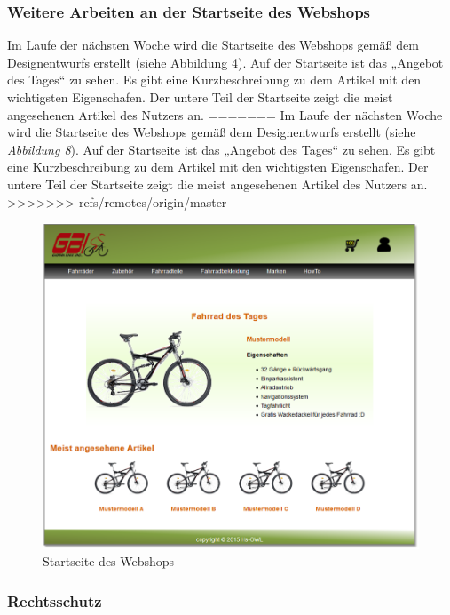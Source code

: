 \subsubsection{Weitere Arbeiten an der Startseite des Webshops}

Im Laufe der nächsten Woche wird die Startseite des Webshops gemäß dem Designentwurfs erstellt (siehe Abbildung 4). Auf der Startseite ist das „Angebot des Tages“ zu sehen. Es gibt eine Kurzbeschreibung zu dem Artikel mit den wichtigsten Eigenschafen. Der untere Teil der Startseite zeigt die meist angesehenen Artikel des Nutzers an. 
=======
Im Laufe der nächsten Woche wird die Startseite des Webshops gemäß dem Designentwurfs erstellt (siehe \textit{Abbildung 8}). Auf der Startseite ist das „Angebot des Tages“ zu sehen. Es gibt eine Kurzbeschreibung zu dem Artikel mit den wichtigsten Eigenschafen. Der untere Teil der Startseite zeigt die meist angesehenen Artikel des Nutzers an. 
>>>>>>> refs/remotes/origin/master

\begin{figure}[H]
\begin{center}

\includegraphics[width=150mm]{Bilder/Abbildung5-StartseiteDesWebshops.png}
\end{center}
\caption{Startseite des Webshops}
\end{figure}


\subsubsection{Rechtsschutz}

